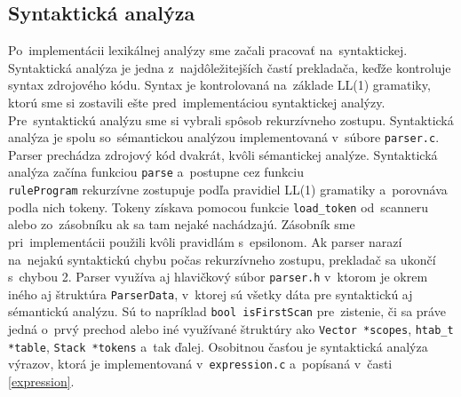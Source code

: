 \documentclass[a4paper, 12pt]{article}[25.11.2020]
\begin{document}
    \subsection{Syntaktická analýza}
        \par Po~implementácii lexikálnej analýzy sme začali pracovať na~syntaktickej.
        Syntaktická analýza je jedna z~najdôležitejších častí prekladača, keďže kontroluje
        syntax zdrojového kódu. Syntax je kontrolovaná na~základe LL(1) gramatiky, ktorú sme si
        zostavili ešte pred~implementáciou syntaktickej analýzy. Pre~syntaktickú analýzu sme si
        vybrali spôsob rekurzívneho zostupu. Syntaktická analýza je spolu so~sémantickou
        analýzou implementovaná v~súbore \verb|parser.c|. Parser prechádza zdrojový kód
        dvakrát, kvôli sémantickej analýze. Syntaktická analýza začína funkciou \verb|parse|
        a~postupne cez funkciu \\ \verb|ruleProgram| rekurzívne zostupuje podľa pravidiel LL(1)
        gramatiky a~porovnáva podla nich tokeny. Tokeny získava pomocou funkcie 
        \verb|load_token| od~scanneru alebo zo~zásobníku ak sa tam nejaké nachádzajú. Zásobník 
        sme pri~implementácii použili kvôli pravidlám s~epsilonom. Ak parser narazí na~nejakú
        syntaktickú chybu počas rekurzívneho zostupu, prekladač sa ukončí s~chybou 2. Parser
        využíva aj hlavičkový súbor \verb|parser.h| v~ktorom je okrem iného aj štruktúra
        \verb|ParserData|, v~ktorej sú všetky dáta pre syntaktickú aj sémantickú analýzu. 
        Sú to napríklad \verb|bool isFirstScan| pre~zistenie, či sa práve jedná o~prvý prechod 
        alebo iné využívané štruktúry ako \verb|Vector *scopes|, \verb|htab_t *table|, 
        \verb|Stack *tokens| a~tak ďalej. Osobitnou časťou je syntaktická analýza výrazov, 
        ktorá je implementovaná v~\verb|expression.c| a~popísaná v~časti \ref{expression}.
\newpage
\end{document}
